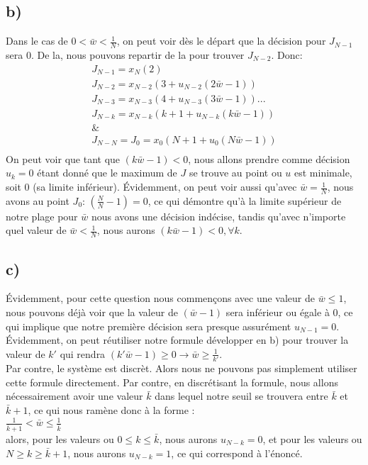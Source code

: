 \documentclass[oneside]{book}
\begin{document}
\subsection*{b)}
Dans le cas de $0 < \bar{w} < \frac{1}{N}$, on peut voir dès le départ que la décision pour $J_{N-1}$ sera 0. De la, nous pouvons repartir de la pour trouver $J_{N-2}$. Donc:\\

\begin{align*}
J_{N-1} = x_N(2)\\
J_{N-2} = x_{N-2}(3 + u_{N-2}(2\bar{w} -1))\\
J_{N-3} = x_{N-3}(4 + u_{N-3}(3\bar{w} -1))...\\
J_{N-k} = x_{N-k}(k+1 + u_{N-k}(k\bar{w} - 1))\\
\&\\
J_{N-N} = J_0 = x_0(N+1 + u_0(N\bar{w} - 1))\\
\end{align*}
On peut voir que tant que $(k\bar{w} - 1) < 0$, nous allons prendre comme décision $u_k = 0$ étant donné que le maximum de $J$ se trouve au point ou $u$ est minimale, soit 0 (sa limite inférieur). Évidemment, on peut voir aussi qu'avec $\bar{w} = \frac{1}{N}$, nous avons au point $J_0$: $(\frac{N}{N} - 1) = 0$, ce qui démontre qu'à la limite supérieur de notre plage pour $\bar{w}$ nous avons une décision indécise, tandis qu'avec n'importe quel valeur de $\bar{w} < \frac{1}{N}$, nous aurons $(k\bar{w} - 1) < 0, \forall k$.\\

\subsection*{c)}
Évidemment, pour cette question nous commençons avec une valeur de $\bar{w} \leq 1$, nous pouvons déjà voir que la valeur de $(\bar{w} - 1)$ sera inférieur ou égale à 0, ce qui implique que notre première décision sera presque assurément $u_{N-1} = 0$. Évidemment, on peut réutiliser notre formule développer en b) pour trouver la valeur de $k'$ qui rendra $(k'\bar{w} - 1) \geq 0 \rightarrow \bar{w} \geq \frac{1}{k'}$.\\

Par contre, le système est discrèt. Alors nous ne pouvons pas simplement utiliser cette formule directement. Par contre, en discrétisant la formule, nous allons nécessairement avoir une valeur $\bar{k}$ dans lequel notre seuil se trouvera entre $\bar{k}$ et $\bar{k}+1$, ce qui nous ramène donc à la forme :\\

$\frac{1}{\bar{k} + 1} < \bar{w} \leq \frac{1}{\bar{k}}$\\

alors, pour les valeurs ou $0 \leq k \leq \bar{k}$, nous aurons $u_{N-k} = 0$, et pour les valeurs ou $N \geq k \geq \bar{k}+1$, nous aurons $u_{N-k} = 1$, ce qui correspond à l'énoncé. 
 
\end{document}
